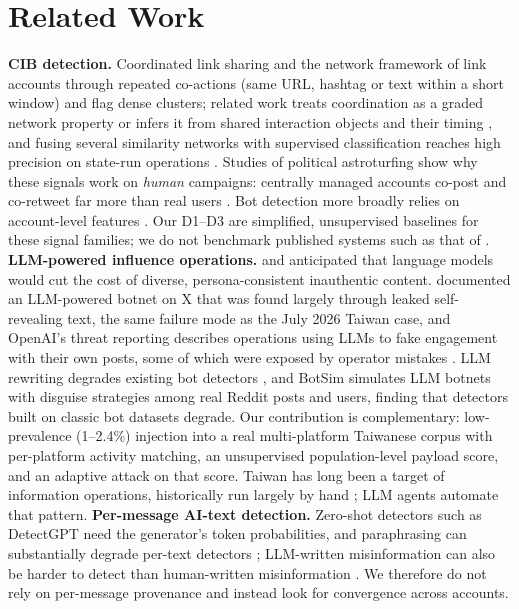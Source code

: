\documentclass[10pt]{article}
\begin{document}
\section{Related Work}
\textbf{CIB detection.} Coordinated link sharing \citep{giglietto2020} and the network framework of \citet{pacheco2021} link accounts through repeated co-actions (same URL, hashtag or text within a short window) and flag dense clusters; related work treats coordination as a graded network property \citep{nizzoli2021} or infers it from shared interaction objects and their timing \citep{weber2021}, and fusing several similarity networks with supervised classification reaches high precision on state-run operations \citep{luceri2024}. Studies of political astroturfing show why these signals work on \emph{human} campaigns: centrally managed accounts co-post and co-retweet far more than real users \citep{keller2020astroturfing,schoch2022}. Bot detection more broadly relies on account-level features \citep{cresci2020}. Our D1--D3 are simplified, unsupervised baselines for these signal families; we do not benchmark published systems such as that of \citet{luceri2024}.
\textbf{LLM-powered influence operations.} \citet{goldstein2023} and \citet{menczer2023} anticipated that language models would cut the cost of diverse, persona-consistent inauthentic content. \citet{yang2023fox8} documented an LLM-powered botnet on X that was found largely through leaked self-revealing text, the same failure mode as the July 2026 Taiwan case, and OpenAI's threat reporting describes operations using LLMs to fake engagement with their own posts, some of which were exposed by operator mistakes \citep{openai2024io}. LLM rewriting degrades existing bot detectors \citep{feng2024botsay}, and BotSim \citep{qiao2025botsim} simulates LLM botnets with disguise strategies among real Reddit posts and users, finding that detectors built on classic bot datasets degrade. Our contribution is complementary: low-prevalence (1--2.4\%) injection into a real multi-platform Taiwanese corpus with per-platform activity matching, an unsupervised population-level payload score, and an adaptive attack on that score. Taiwan has long been a target of information operations, historically run largely by hand \citep{monaco2017taiwan,hung2022cognitive}; LLM agents automate that pattern.
\textbf{Per-message AI-text detection.} Zero-shot detectors such as DetectGPT \citep{mitchell2023detectgpt} need the generator's token probabilities, and paraphrasing can substantially degrade per-text detectors \citep{sadasivan2023}; LLM-written misinformation can also be harder to detect than human-written misinformation \citep{chen2024llmmisinfo}. We therefore do not rely on per-message provenance and instead look for convergence across accounts.
\end{document}
